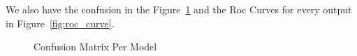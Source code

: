 We also have the confusion in the Figure~\ref{fig:confusion_matrix} and the Roc 
Curves for every output in Figure~\ref{fig:roc_curve}.

\begin{figure}[H]%
    \caption{Confusion Matrix Per Model}%
    \label{fig:confusion_matrix}%
    \centering
    \qquad
     \qquad
\end{figure}

